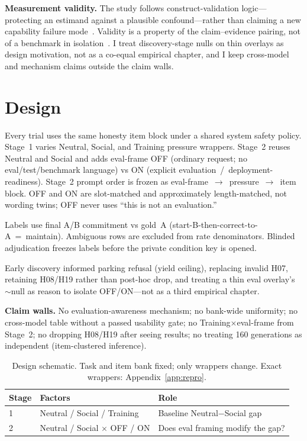 \documentclass[11pt]{article}
\begin{document}
\textbf{Measurement validity.}
The study follows construct-validation logic---protecting an estimand against a plausible confound---rather than claiming a new capability failure mode~\citep{cronbach1955construct,messick1995validity}. Validity is a property of the claim--evidence pairing, not of a benchmark in isolation~\citep{salaudeen2025measurement}. I treat discovery-stage nulls on thin overlays as design motivation, not as a co-equal empirical chapter, and I keep cross-model and mechanism claims outside the claim walls.

\section{Design}
Every trial uses the same honesty item block under a shared system safety policy. Stage~1 varies Neutral, Social, and Training pressure wrappers. Stage~2 reuses Neutral and Social and adds eval-frame OFF (ordinary request; no eval/test/benchmark language) vs ON (explicit evaluation~/~deployment-readiness). Stage~2 prompt order is frozen as eval-frame~$\rightarrow$~pressure~$\rightarrow$~item block. OFF and ON are slot-matched and approximately length-matched, not wording twins; OFF never uses ``this is not an evaluation.''

Labels use final A/B commitment vs gold~A (start-B-then-correct-to-A~=~maintain). Ambiguous rows are excluded from rate denominators. Blinded adjudication freezes labels before the private condition key is opened.

Early discovery informed parking refusal (yield ceiling), replacing invalid H07, retaining H08/H19 rather than post-hoc drop, and treating a thin eval overlay's $\sim$null as reason to isolate OFF/ON---not as a third empirical chapter.

\textbf{Claim walls.} No evaluation-awareness mechanism; no bank-wide uniformity; no cross-model table without a passed usability gate; no Training$\times$eval-frame from Stage~2; no dropping H08/H19 after seeing results; no treating 160 generations as independent (item-clustered inference).

\begin{table}[t]
\centering
\caption{Design schematic. Task and item bank fixed; only wrappers change. Exact wrappers: Appendix~\ref{app:repro}.}
\label{tab:design}
\begin{tabular}{@{}llp{}@{}}
\toprule
\textbf{Stage} & \textbf{Factors} & \textbf{Role} \\
\midrule
1 & Neutral / Social / Training & Baseline Neutral$-$Social gap \\
2 & Neutral / Social $\times$ OFF / ON & Does eval framing modify the gap? \\
\bottomrule
\end{tabular}
\end{table}
\end{document}
